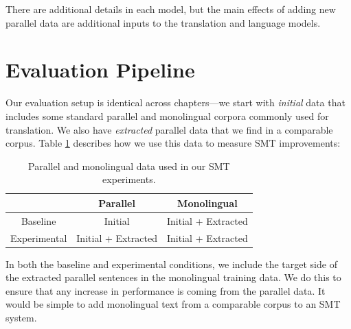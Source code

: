 There are additional details in each model, but the main effects of adding new
parallel data are additional inputs to the translation and language models.

\section{Evaluation Pipeline}
Our evaluation setup is identical across chapters---we start with {\em initial}
data that includes some standard parallel and monolingual corpora commonly used for 
translation. We also have {\em extracted} parallel data that we find in a comparable
corpus. Table \ref{tab:exp_setup} describes how we use this data to measure SMT
improvements:

\begin{table}
\begin{center}
\begin{tabular}{|c||c|c|}
\hline
& Parallel & Monolingual \\
\hline
Baseline & Initial & Initial + Extracted \\
\hline
Experimental & Initial + Extracted & Initial + Extracted \\
\hline
\end{tabular}
\end{center}
\label{tab:exp_setup}
\caption{Parallel and monolingual data used in our SMT experiments.}
\end{table}

In both the baseline and experimental conditions, we include the target side of
the extracted parallel sentences in the monolingual training data. We do this to
ensure that any increase in performance is coming from the parallel data. It
would be simple to add monolingual text from a comparable corpus to an SMT
system.

